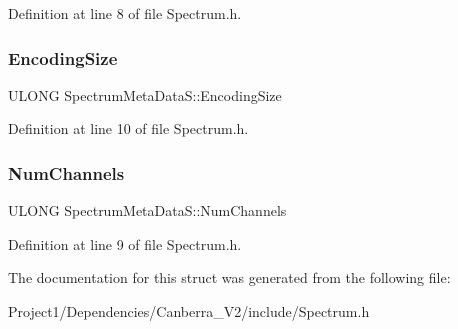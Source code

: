 Definition at line 8 of file Spectrum.\+h.

\mbox{\label{struct_spectrum_meta_data_s_a5973d9cdcf2fd879d59b0c6572d5e27d}} 
\subsubsection{\texorpdfstring{Encoding\+Size}{EncodingSize}}
{\footnotesize\ttfamily U\+L\+O\+NG Spectrum\+Meta\+Data\+S\+::\+Encoding\+Size}



Definition at line 10 of file Spectrum.\+h.

\mbox{\label{struct_spectrum_meta_data_s_a745f4e9d81b2f20409f2100ca5dfd3b8}} 
\subsubsection{\texorpdfstring{Num\+Channels}{NumChannels}}
{\footnotesize\ttfamily U\+L\+O\+NG Spectrum\+Meta\+Data\+S\+::\+Num\+Channels}



Definition at line 9 of file Spectrum.\+h.



The documentation for this struct was generated from the following file\+:\begin{DoxyCompactItemize}
\item 
Project1/\+Dependencies/\+Canberra\+\_\+\+V2/include/Spectrum.\+h\end{DoxyCompactItemize}
